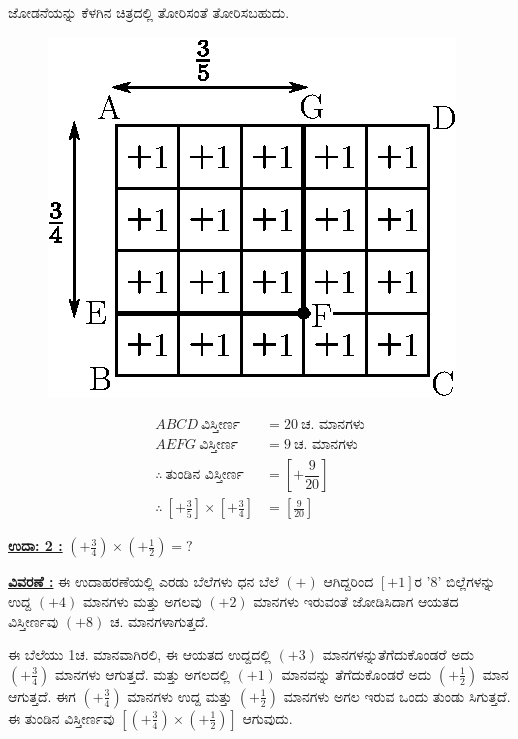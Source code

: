 ಜೋಡನೆಯನ್ನು ಕೆಳಗಿನ ಚಿತ್ರದಲ್ಲಿ ತೋರಿಸಂತೆ ತೋರಿಸಬಹುದು. 
\begin{figure}[H]
\centering
\includegraphics[scale=0.8]{src/figure/chap3/fig3-23b.eps}
\end{figure}
\begin{align*}
ABCD ~\text{ವಿಸ್ತೀರ್ಣ}  & = 20 ~\text{ಚ. ಮಾನಗಳು}\\
AEFG ~\text{ವಿಸ್ತೀರ್ಣ} & = 9 ~\text{ಚ. ಮಾನಗಳು}\\
\therefore ~\text{ತುಂಡಿನ ವಿಸ್ತೀರ್ಣ} & = \left[+\dfrac{9}{20}\right]\\
\therefore \ \left[+\frac{3}{5}\right]\times \left[+\frac{3}{4}\right] &=\left[\frac{9}{20}\right]
\end{align*}

\noindent
{\textbf{\underline{ಉದಾ: 2 :}}} $\left(+\frac{3}{4} \right) \times \left(+\frac{1}{2} \right) = ?$

\noindent
{\textbf{\underline{ವಿವರಣೆ :}}} ಈ ಉದಾಹರಣೆಯಲ್ಲಿ ಎರಡು ಬೆಲೆಗಳು ಧನ ಬೆಲೆ $(+)$ ಆಗಿದ್ದರಿಂದ $[+1]$ರ '8' ಬಿಲ್ಲೆಗಳನ್ನು ಉದ್ದ $(+4)$ ಮಾನಗಳು ಮತ್ತು ಅಗಲವು $(+2)$ ಮಾನಗಳು ಇರುವಂತೆ ಜೋಡಿಸಿದಾಗ ಆಯತದ ವಿಸ್ತೀರ್ಣವು $(+8)$ ಚ. ಮಾನಗಳಾಗುತ್ತದೆ. 

ಈ ಬೆಲೆಯು 1ಚ. ಮಾನವಾಗಿರಲಿ, ಈ ಆಯತದ ಉದ್ದದಲ್ಲಿ $(+3)$ ಮಾನಗಳನ್ನು\break  ತೆಗೆದುಕೊಂಡರೆ ಅದು $\left(+\frac{3}{4} \right)$ ಮಾನಗಳು ಆಗುತ್ತದೆ. ಮತ್ತು ಅಗಲದಲ್ಲಿ $(+1)$ ಮಾನವನ್ನು ತೆಗೆದುಕೊಂಡರೆ ಅದು $\left(+\frac{1}{2}\right)$ ಮಾನ ಆಗುತ್ತದೆ. ಈಗ $\left(+\frac{3}{4} \right)$ ಮಾನಗಳು ಉದ್ದ ಮತ್ತು $\left(+\frac{1}{2} \right)$ ಮಾನಗಳು ಅಗಲ ಇರುವ ಒಂದು ತುಂಡು ಸಿಗುತ್ತದೆ. ಈ ತುಂಡಿನ ವಿಸ್ತೀರ್ಣವು $\left[\left(+\frac{3}{4}\right) \times \left(+\frac{1}{2}\right) \right]$ ಆಗುವುದು. 
  
